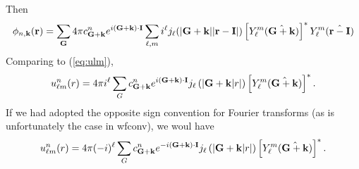 \documentclass{article}
\begin{document}
Then
\begin{equation}
\phi_{n,\mathbf{k}}(\mathbf{r}) =  \sum_{\mathbf{G}} 4\pi c_{\mathbf{G}+\mathbf{k}}^n
e^{i(\mathbf{G}+\mathbf{k})\cdot\mathbf{I}} \sum_{\ell,m}
  i^\ell j_\ell(|\mathbf{G} +\mathbf{k}||\mathbf{r}-\mathbf{I}|)
  \left[Y_\ell^m(\hat{\mathbf{G}+\mathbf{k}})\right]^*
Y_\ell^m(\hat{\mathbf{r} - \mathbf{I}})
\end{equation}
Comparing to (\ref{eq:ulm}),
\begin{equation}
u_{\ell m}^n(r) = 4\pi i^\ell \sum_G c_{\mathbf{G}+\mathbf{k}}^n e^{i(\mathbf{G}+\mathbf{k})\cdot\mathbf{I}}  j_\ell\left(|\mathbf{G} + \mathbf{k}|r|\right)
\left[Y_\ell^m(\hat{\mathbf{G} + \mathbf{k}})\right]^*.
\end{equation}
If we had adopted the opposite sign convention for Fourier transforms
(as is unfortunately the case in wfconv), we woul have
\begin{equation}
u_{\ell m}^n(r) = 4\pi (-i)^\ell \sum_G c_{\mathbf{G}+\mathbf{k}}^n e^{-i(\mathbf{G}+\mathbf{k})\cdot\mathbf{I}}  j_\ell\left(|\mathbf{G} + \mathbf{k}|r|\right)
\left[Y_\ell^m(\hat{\mathbf{G} + \mathbf{k}})\right]^*.
\end{equation}
\end{document}
